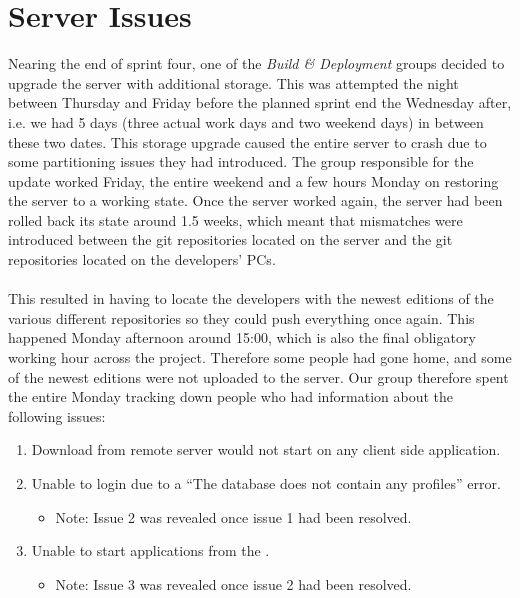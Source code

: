 
\section{Server Issues} 
\label{sec:server_issues}

Nearing the end of sprint four, one of the \emph{Build \& Deployment} groups decided to upgrade the server with additional storage. This was attempted the night between Thursday and Friday before the planned sprint end the Wednesday after, i.e. we had 5 days (three actual work days and two weekend days) in between these two dates. This storage upgrade caused the entire server to crash due to some partitioning issues they had introduced. The group responsible for the update worked Friday, the entire weekend and a few hours Monday on restoring the server to a working state. Once the server worked again, the server had been rolled back its state around 1.5 weeks, which meant that mismatches were introduced between the git repositories located on the server and the git repositories located on the developers' PCs. 
\\\\
This resulted in having to locate the developers with the newest editions of the various different repositories so they could push everything once again. This happened Monday afternoon around 15:00, which is also the final obligatory working hour across the project. Therefore some people had gone home, and some of the newest editions were not uploaded to the server. Our group therefore spent the entire Monday tracking down people who had information about the following issues:

\begin{enumerate}
    \item Download from remote server would not start on any client side application.
    \item Unable to login due to a ``The database does not contain any profiles'' error.
    \begin{itemize}
        \item Note: Issue 2 was revealed once issue 1 had been resolved.
    \end{itemize}
    \item Unable to start applications from the \launcher.   
    \begin{itemize}
        \item Note: Issue 3 was revealed once issue 2 had been resolved. 
    \end{itemize}
\end{enumerate}

